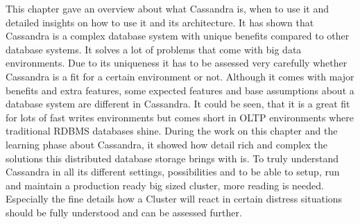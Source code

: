 This chapter gave an overview about what Cassandra is, when to use it and detailed insights on how to use it and its architecture. It has shown that Cassandra is a complex database system with unique benefits compared to other database systems. It solves a lot of problems that come with big data environments. Due to its uniqueness it has to be assessed very carefully whether Cassandra is a fit for a certain environment or not. Although it comes with major benefits and extra features, some expected features and base assumptions about a database system are different in Cassandra.
It could be seen, that it is a great fit for lots of fast writes environments but comes short in OLTP environments where traditional RDBMS databases shine.
During the work on this chapter and the learning phase about Cassandra, it showed how detail rich and complex the solutions this distributed database storage brings with is. To truly understand Cassandra in all its different settings, possibilities and to be able to setup, run and maintain a production ready big sized cluster, more reading is needed. Especially the fine details how a Cluster will react in certain distress situations should be fully understood and can be assessed further.
